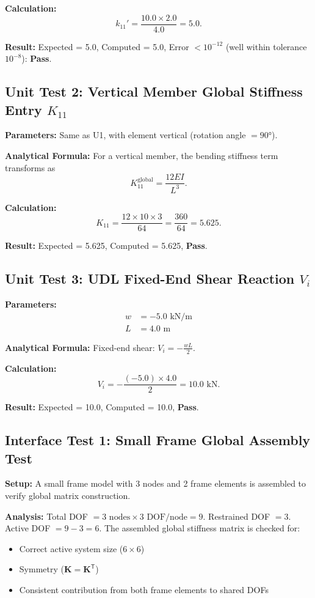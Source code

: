 \textbf{Calculation:}
\[
k_{11}' = \frac{10.0 \times 2.0}{4.0} = 5.0.
\]

\textbf{Result:} Expected = 5.0, Computed = 5.0, Error $< 10^{-12}$ (well within tolerance $10^{-8}$): \textbf{Pass}.

\subsection*{Unit Test 2: Vertical Member Global Stiffness Entry $K_{11}$}

\textbf{Parameters:} Same as U1, with element vertical (rotation angle $= 90°$).

\textbf{Analytical Formula:}
For a vertical member, the bending stiffness term transforms as
\[
K_{11}^{\text{global}} = \frac{12 E I}{L^3}.
\]

\textbf{Calculation:}
\[
K_{11} = \frac{12 \times 10 \times 3}{64} = \frac{360}{64} = 5.625.
\]

\textbf{Result:} Expected = 5.625, Computed = 5.625, \textbf{Pass}.

\subsection*{Unit Test 3: UDL Fixed-End Shear Reaction $V_i$}

\textbf{Parameters:}
\begin{align*}
w &= -5.0 \text{ kN/m} \\
L &= 4.0 \text{ m}
\end{align*}

\textbf{Analytical Formula:}
Fixed-end shear: $V_i = -\frac{wL}{2}$.

\textbf{Calculation:}
\[
V_i = -\frac{(-5.0) \times 4.0}{2} = 10.0 \text{ kN}.
\]

\textbf{Result:} Expected = 10.0, Computed = 10.0, \textbf{Pass}.

\subsection*{Interface Test 1: Small Frame Global Assembly Test}

\textbf{Setup:} A small frame model with 3 nodes and 2 frame elements is assembled to verify global matrix construction.

\textbf{Analysis:}
Total DOF $= 3 \text{ nodes} \times 3 \text{ DOF/node} = 9$. Restrained DOF $= 3$. Active DOF $= 9 - 3 = 6$.
The assembled global stiffness matrix is checked for:
\begin{itemize}
    \item Correct active system size ($6 \times 6$)
    \item Symmetry ($\mathbf{K} = \mathbf{K}^{\mathsf{T}}$)
    \item Consistent contribution from both frame elements to shared DOFs
\end{itemize}

